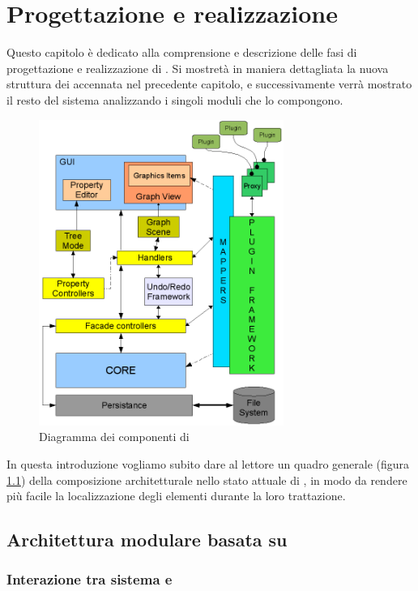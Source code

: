 \chapter{Progettazione e realizzazione}\label{capitolo:progettazione_realizzazione}
Questo capitolo è dedicato alla comprensione e descrizione delle fasi di progettazione e realizzazione di \visualnetkit{}. Si mostretà in maniera dettagliata la nuova struttura dei \plugin{} accennata nel precedente capitolo, e successivamente verrà mostrato il resto del sistema analizzando i singoli moduli che lo compongono.

\begin{figure}[!htb]
	\centering
	\includegraphics[width=8cm]{images/diagramma_componenti_vnetkit.png}
	\caption{Diagramma dei componenti di \visualnetkit{}}
	\label{figura:vn_componenti}
\end{figure}

In questa introduzione vogliamo subito dare al lettore un quadro generale (figura \ref{figura:vn_componenti}) della composizione architetturale nello stato attuale di \visualnetkit{}, in modo da rendere più facile la localizzazione degli elementi durante la loro trattazione.

\section{Architettura modulare basata su \plugin{}}
\subsection{Interazione tra sistema e \plugin{}}

